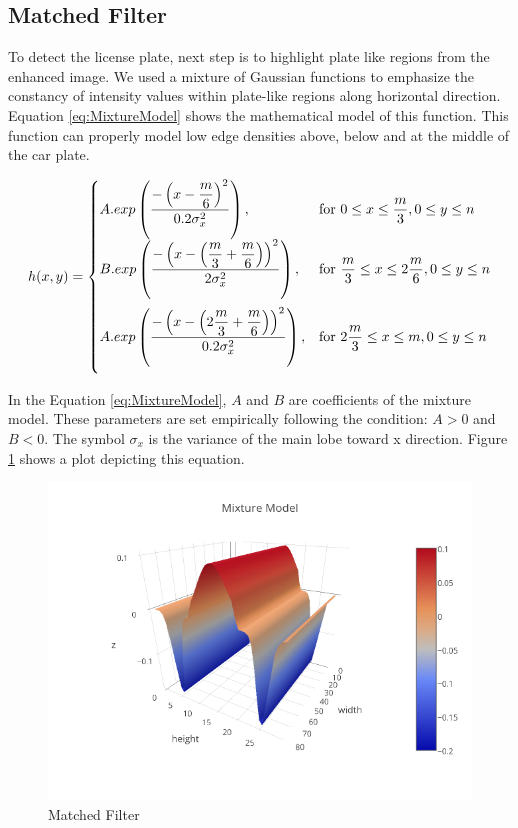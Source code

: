 \documentclass{standalone}
\begin{document}
\subsection{Matched Filter}
To detect the license plate, next step is to highlight plate like regions from the enhanced image. We used a mixture of Gaussian functions to emphasize the constancy of intensity values within plate-like regions along horizontal direction. Equation \ref{eq:MixtureModel} shows the mathematical model of this function. This function can properly model low edge densities above, below and at the middle of the car plate. 

\begin{equation} \label{eq:MixtureModel}
h(x, y) = 
\begin{cases} 
	A.exp \left(
    	\dfrac{ -\left(x - \dfrac{m}{6} \right)^2 }
        	{ 0.2 \sigma_x^2 } \right),                                      
    	& \mbox{for } 
        	0 \leq x \leq \dfrac{m}{3}, 
            0 \leq y \leq n     
    \\ \vspace{0.2cm}
    B.exp \left( 
    	\dfrac{ -\left(x - 
        			\left( \dfrac{m}{3} + \dfrac{m}{6} \right) 
                \right)^2 }
        	{ 2 \sigma_x^2 } \right),                
        & \mbox{for }
        	\dfrac{m}{3} \leq x \leq 2\dfrac{m}{6}, 
        	0 \leq y \leq n 
    \\ \vspace{0.2cm}
    A.exp \left( 
    	\dfrac{ -\left(x - 
        			\left( 2\dfrac{m}{3} + \dfrac{m}{6} \right) 
                \right)^2 }
        	{ 0.2 \sigma_x^2 } \right),
    	& \mbox{for } 
        	2\dfrac{m}{3} \leq x \leq m, 
            0 \leq y \leq n         
\end{cases}
\end{equation}


In the Equation \ref{eq:MixtureModel}, 
$A$ and $B$ are coefficients of the mixture model. These parameters are set empirically following the condition: $A > 0$ and $B < 0$. 
The symbol $\sigma_x$ is the variance of the main lobe toward x direction. 
Figure \ref{fig:MixtureModelPlot} shows a plot depicting this equation.
\begin{figure} 
	\centering
	\includegraphics[width=.8\linewidth]{./img/plots/mixture.png}
	\caption{Matched Filter} 
	\label{fig:MixtureModelPlot}
\end{figure}
\end{document}
